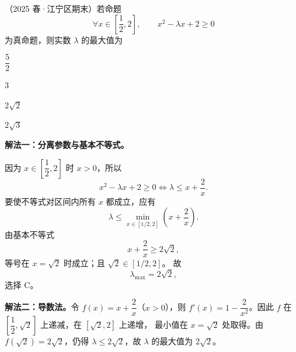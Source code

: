\documentclass[zihao=-4]{exam-zh}
\begin{document}
\begin{question}[points=5]
（2025 春·江宁区期末）若命题
\[
 \forall x\in\left[\frac12,2\right],\qquad
 x^2-\lambda x+2\ge0
\]
为真命题，则实数 $\lambda$ 的最大值为 \paren[C]
\begin{choices}
  \item $\dfrac52$
  \item $3$
  \item $2\sqrt2$
  \item $2\sqrt3$
\end{choices}
\begin{solution}
\textbf{解法一：分离参数与基本不等式。}

因为 $x\in\left[\dfrac12,2\right]$ 时 $x>0$，所以
\[
 x^2-\lambda x+2\ge0
 \iff \lambda\le x+\frac2x.
\]
要使不等式对区间内所有 $x$ 都成立，应有
\[
 \lambda\le
 \min_{x\in[1/2,2]}\left(x+\frac2x\right).
\]
由基本不等式
\[
 x+\frac2x\ge2\sqrt2,
\]
等号在 $x=\sqrt2$ 时成立；且 $\sqrt2\in[1/2,2]$。
故
\[
 \boxed{\lambda_{\max}=2\sqrt2},
\]
选择 C。\par\noindent
\textbf{解法二：导数法。}令 $f(x)=x+\dfrac2x$（$x>0$），则
$f'(x)=1-\dfrac2{x^2}$。因此 $f$ 在
$\left[\dfrac12,\sqrt2\right]$ 上递减，在 $[\sqrt2,2]$ 上递增，
最小值在 $x=\sqrt2$ 处取得。由 $f(\sqrt2)=2\sqrt2$，仍得
$\lambda\le2\sqrt2$，故 $\lambda$ 的最大值为 $2\sqrt2$。
\end{solution}
\end{question}
\end{document}
